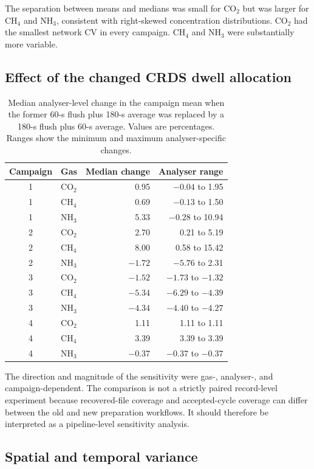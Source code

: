 \documentclass[11pt,a4paper]{article}
\begin{document}
The separation between means and medians was small for CO$_2$ but was larger for CH$_4$ and NH$_3$, consistent with right-skewed concentration distributions. CO$_2$ had the smallest network CV in every campaign. CH$_4$ and NH$_3$ were substantially more variable.

\subsection{Effect of the changed CRDS dwell allocation}

\begin{table}[H]
\centering
\caption{Median analyser-level change in the campaign mean when the former 60-s flush plus 180-s average was replaced by a 180-s flush plus 60-s average. Values are percentages. Ranges show the minimum and maximum analyser-specific changes.}
\small
\begin{tabular}{clrr}
\toprule
Campaign & Gas & Median change & Analyser range\\
\midrule
1 & CO$_2$ & 0.95 & $-0.04$ to 1.95\\
1 & CH$_4$ & 0.69 & $-0.13$ to 1.50\\
1 & NH$_3$ & 5.33 & $-0.28$ to 10.94\\
2 & CO$_2$ & 2.70 & 0.21 to 5.19\\
2 & CH$_4$ & 8.00 & 0.58 to 15.42\\
2 & NH$_3$ & $-1.72$ & $-5.76$ to 2.31\\
3 & CO$_2$ & $-1.52$ & $-1.73$ to $-1.32$\\
3 & CH$_4$ & $-5.34$ & $-6.29$ to $-4.39$\\
3 & NH$_3$ & $-4.34$ & $-4.40$ to $-4.27$\\
4 & CO$_2$ & 1.11 & 1.11 to 1.11\\
4 & CH$_4$ & 3.39 & 3.39 to 3.39\\
4 & NH$_3$ & $-0.37$ & $-0.37$ to $-0.37$\\
\bottomrule
\end{tabular}
\end{table}

The direction and magnitude of the sensitivity were gas-, analyser-, and campaign-dependent. The comparison is not a strictly paired record-level experiment because recovered-file coverage and accepted-cycle coverage can differ between the old and new preparation workflows. It should therefore be interpreted as a pipeline-level sensitivity analysis.

\subsection{Spatial and temporal variance}
\end{document}
